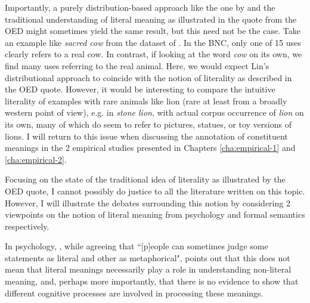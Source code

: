 Importantly, a purely distribution-based approach like the one by
\citet{Lin:1999} and the traditional understanding of literal meaning
as illustrated in the quote from the OED might sometimes yield the
same result, but this need not be the case. Take an example like \emph{sacred
  cow} from the dataset of
\citet{Reddyetal:2011}. In the BNC, only one of 15 uses clearly refers
to a real cow. In contrast, if looking at the word \emph{cow} on its
own, we find many uses referring to the real animal. Here, we would
expect Lin's distributional approach to coincide with the notion of
literality as described in the OED quote. However, it would be
interesting to compare the intuitive literality of examples with rare animals like lion (rare at least from a broadly
western point of view), e.g. in \emph{stone lion}, with actual corpus
occurrence of \emph{lion} on its own, many of which do seem to refer to
pictures, statues, or toy versions of lions. I will
return to this issue when discussing the annotation of constituent meanings in the 2 empirical studies presented in Chapters \ref{cha:empirical-1} and \ref{cha:empirical-2}.

Focusing on the state of the traditional idea of literality as
illustrated by the OED quote, I cannot possibly do justice to all the literature written on this
topic. However, I will illustrate the debates surrounding this notion
by considering 2 viewpoints on the notion of literal meaning from psychology
and formal semantics respectively.

\enlargethispage{1\baselineskip}
In psychology, \citet[249]{Gibbs:1989}, while agreeing that 
``[p]eople can sometimes judge some statements as literal and other as
metaphorical", points out that this does not
mean that literal meanings necessarily play a role in understanding
non-literal meaning, and, perhaps more importantly, that there is no
evidence to show that different cognitive processes are involved in processing
these meanings. 

